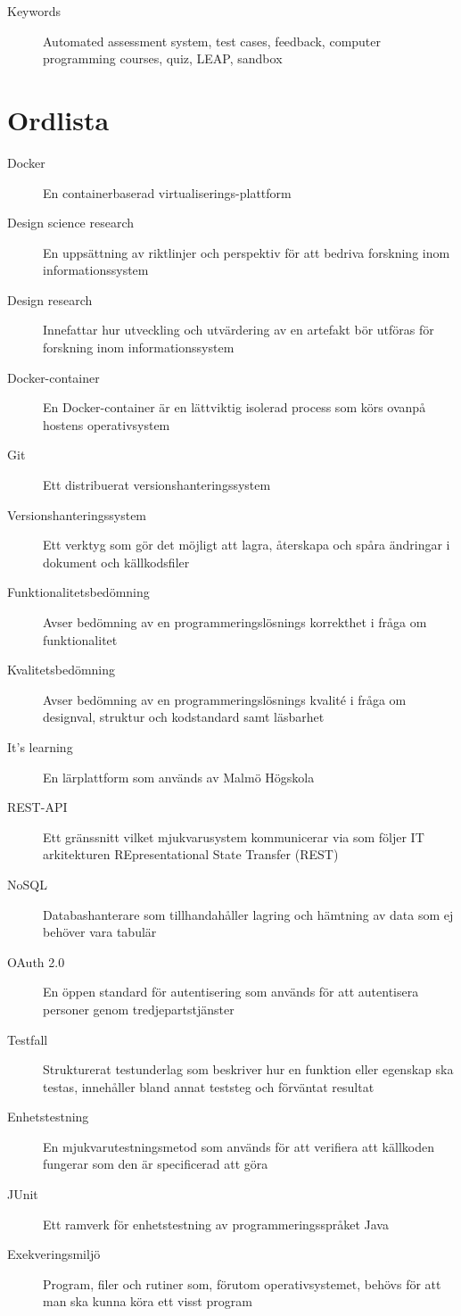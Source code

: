 \documentclass[a4paper,11pt]{article}
\begin{document}
{\begin{description}
    \item[Keywords] Automated assessment system, test cases, feedback, computer programming courses, quiz, LEAP, sandbox
\end{description}

\newpage

\mbox{}

\newpage

\section*{Ordlista}
\begin{description}
    \item [Docker] En containerbaserad virtualiserings-plattform
    \item [Design science research] En uppsättning av riktlinjer och perspektiv för att bedriva forskning inom informationssystem
    \item [Design research] Innefattar hur utveckling och utvärdering av en artefakt bör utföras för forskning inom informationssystem
    \item [Docker-container] En Docker-container är en lättviktig isolerad process som körs ovanpå hostens operativsystem
    \item [Git] Ett distribuerat versionshanteringssystem
    \item [Versionshanteringssystem] Ett verktyg som gör det möjligt att lagra, återskapa och spåra ändringar i dokument och källkodsfiler
    \item [Funktionalitetsbedömning] Avser bedömning av en programmeringslösnings korrekthet i fråga om funktionalitet
    \item [Kvalitetsbedömning] Avser bedömning av en programmeringslösnings kvalité i fråga om designval, struktur och kodstandard samt läsbarhet
    \item [It's learning] En lärplattform som används av Malmö Högskola
    \item [REST-API] Ett gränssnitt vilket mjukvarusystem kommunicerar via som följer IT arkitekturen REpresentational State Transfer (REST)
    \item [NoSQL] Databashanterare som tillhandahåller lagring och hämtning av data som ej behöver vara tabulär
    \item [OAuth 2.0] En öppen standard för autentisering som används för att autentisera personer genom tredjepartstjänster
    \item [Testfall] Strukturerat testunderlag som beskriver hur en funktion eller egenskap ska testas, innehåller bland annat teststeg och förväntat resultat
    \item [Enhetstestning] En mjukvarutestningsmetod som används för att verifiera att källkoden fungerar som den är specificerad att göra
    \item [JUnit] Ett ramverk för enhetstestning av programmeringsspråket Java
    \item [Exekveringsmiljö] Program, filer och rutiner som, förutom operativsystemet, behövs för att man ska kunna köra ett visst program
\end{description}


}
\end{document}
